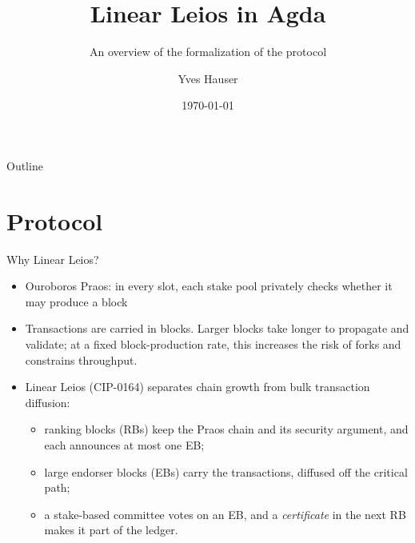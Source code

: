 \documentclass[aspectratio=169,10pt]{beamer}
\title{Linear Leios in Agda}
\subtitle{An overview of the formalization of the protocol}
\author{Yves Hauser}
\institute{Input Output}
\date{\today}
\begin{document}
\maketitle

\begin{frame}{Outline}
  \tableofcontents
\end{frame}

\section{Protocol}

\begin{frame}{Why Linear Leios?}
  \begin{itemize}
    \item Ouroboros Praos: in every slot, each stake pool privately checks
          whether it may produce a block
    \item Transactions are carried in blocks. Larger blocks take
          longer to propagate and validate; at a fixed block-production
          rate, this increases the risk of forks and constrains throughput.
    \item Linear Leios (CIP-0164) separates chain growth from bulk
          transaction diffusion:
      \begin{itemize}
        \item \textcolor{rb}{ranking blocks} (RBs) keep the Praos chain and
              its security argument, and each announces at most one EB;
        \item large \textcolor{eb}{endorser blocks} (EBs) carry the
              transactions, diffused off the critical path;
        \item a stake-based committee \textcolor{vt}{votes} on an EB, and a
              \emph{certificate} in the next RB makes it part of the ledger.
      \end{itemize}
  \end{itemize}
\end{frame}
\end{document}
